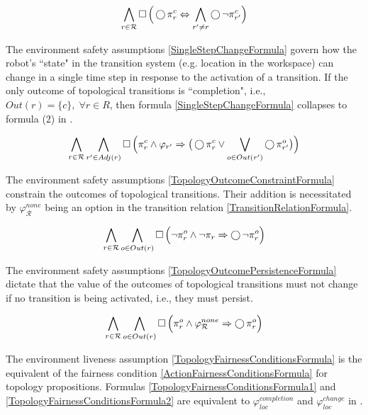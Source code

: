 \begin{equation}\label{TopologyMutexFormula}
	\bigwedge \limits_{r \in \mathcal{R}} \operatorname{\Box} \Big( \operatorname{\bigcirc} \pi_r^c \Leftrightarrow \bigwedge \limits_{r^\prime \neq r} \operatorname{\bigcirc} \lnot \pi_{r^\prime}^c \Big)
\end{equation}

The environment safety assumptions \eqref{SingleStepChangeFormula} govern how the robot's ``state" in the transition system (e.g. location in the workspace) can change in a single time step in response to the activation of a transition.
If the only outcome of topological transitions is ``completion", i.e., $Out(r) = \{ c \}, \; \forall r \in R$, then formula \eqref{SingleStepChangeFormula} collapses to formula (2) in \cite{Vasu2013ICRA}.

\begin{equation}\label{SingleStepChangeFormula}
	\bigwedge \limits_{r \in \mathcal{R}} \bigwedge \limits_{r^\prime \in Adj(r)} \operatorname{\Box} \Big( \pi_r^c \wedge  \varphi_{r^\prime} \Rightarrow \big( \operatorname{\bigcirc} \pi_{r}^c \vee \bigvee \limits_{o \in Out(r^\prime)} \operatorname{\bigcirc} \pi_{r^\prime}^o \big) \Big)
\end{equation}

The environment safety assumptions \eqref{TopologyOutcomeConstraintFormula} constrain the outcomes of topological transitions.
Their addition is necessitated by $\varphi_\mathcal{R}^{none}$ being an option in the transition relation \eqref{TransitionRelationFormula}.

\begin{equation}\label{TopologyOutcomeConstraintFormula}
	\bigwedge \limits_{r \in \mathcal{R}} \bigwedge \limits_{o \in Out(r)} \operatorname{\Box} \Big( \lnot \pi_r^o \wedge \lnot \pi_r \Rightarrow \operatorname{\bigcirc} \lnot \pi_r^o \Big)
\end{equation}

The environment safety assumptions \eqref{TopologyOutcomePersistenceFormula} dictate that the value of the outcomes of topological transitions must not change if no transition is being activated, i.e., they must persist.

\begin{equation}\label{TopologyOutcomePersistenceFormula}
	\bigwedge \limits_{r \in \mathcal{R}} \bigwedge \limits_{o \in Out(r)} \operatorname{\Box} \Big( \pi_r^o \wedge \varphi_\mathcal{R}^{none} \Rightarrow \operatorname{\bigcirc} \pi_r^o \Big)
\end{equation}

The environment liveness assumption \eqref{TopologyFairnessConditionsFormula} is the equivalent of the fairness condition \eqref{ActionFairnessConditionsFormula} for topology propositions.
Formulas \eqref{TopologyFairnessConditionsFormula1} and \eqref{TopologyFairnessConditionsFormula2} are equivalent to $\varphi_{loc}^{completion}$ and $\varphi_{loc}^{change}$ in \cite{Vasu2013ICRA}.

